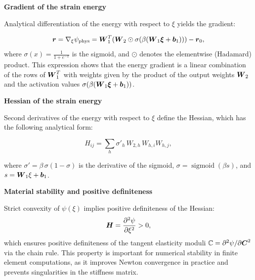 \textbf{Gradient of the strain energy}

Analytical differentiation of the energy with respect to \(\xi\) yields the gradient:

\begin{equation}
 \vect{r} = \nabla_\xi \psi_{\mathrm{phys}} = \vect W_1^T \left( \vect W_2 \odot \sigma(\beta (\vect W_1 \vect \xi + \vect b_1)) \right) - \vect r_0,
\label{eq:energy_gradient}
\end{equation}
where $\sigma(x) = \frac{1}{1 + e^{-x}}$ is the sigmoid, 
and $\odot$ denotes the elementwise (Hadamard) product. 
This expression shows that the energy gradient is a linear combination of the rows of $\boldsymbol{W}_1^T$ with weights 
given by the product of the output weights $\boldsymbol{W}_2$ and the activation values $\sigma(\beta (\boldsymbol{W}_1 \boldsymbol{\xi} + \boldsymbol{b}_1))$.

\textbf{Hessian of the strain energy}

Second derivatives of the energy with respect to \(\xi\) define the Hessian, which has the following analytical form:

\begin{equation}
 H_{ij} = \sum_h \sigma'_h\,W_{2,h}\,W_{h,i}W_{h,j},
\label{eq:energy_hessian}
\end{equation}

where $\sigma' = \beta\,\sigma(1-\sigma)$ is the derivative of the sigmoid, 
$\sigma=\operatorname{sigmoid}(\beta s)$, and $s=\boldsymbol{W}_1\xi+\boldsymbol{b}_1$.

\textbf{Material stability and positive definiteness}

Strict convexity of \(\psi(\xi)\) implies positive definiteness of the Hessian:
\begin{equation}
 \boldsymbol{H} = \frac{\partial^2\psi}{\partial\xi^2} > 0,
\label{eq:positive_hessian}
\end{equation}
which ensures positive definiteness of the tangent elasticity moduli 
$\mathbb{C} = \partial^2\psi/\partial\boldsymbol{C}^2$ via the chain rule. 
This property is important for numerical stability in finite element computations, 
as it improves Newton convergence in practice and prevents singularities in the stiffness matrix.

